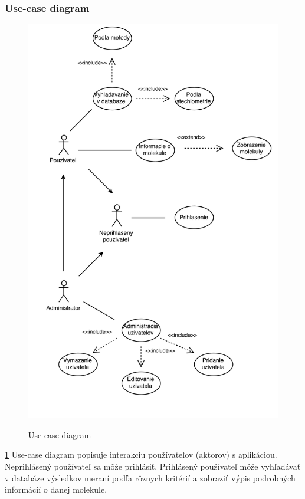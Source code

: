 \documentclass[12pt,a4paper]{article}
\begin{document}
\subsubsection{Use-case diagram}
\begin{figure}[H]
	\caption{Use-case diagram}
	\includegraphics[width=\textwidth]{use-case}
	\label{fig:use_case}
\end{figure}
\ref{fig:use_case}
Use-case diagram popisuje interakciu používateľov (aktorov) s aplikáciou. Neprihlásený používateľ sa môže prihlásiť. Prihlásený používateľ môže vyhľadávať v databáze výsledkov meraní podľa rôznych kritérií a zobraziť výpis podrobných informácií o danej molekule.
\end{document}
